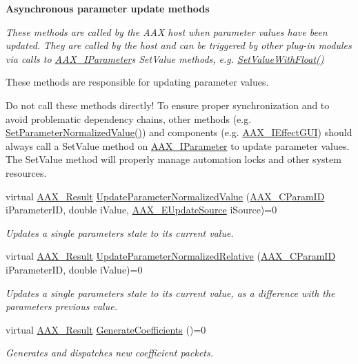 \begin{Indent}{\bf Asynchronous parameter update methods}\par
{\em These methods are called by the A\+A\+X host when parameter values have been updated. They are called by the host and can be triggered by other plug-\/in modules via calls to \hyperlink{a00108}{A\+A\+X\+\_\+\+I\+Parameter}\textquotesingle{}s {\ttfamily Set\+Value} methods, e.\+g. \hyperlink{a00108_a1d37b80bc3a9c4e53fc2c1684f47dfb7}{Set\+Value\+With\+Float()}

These methods are responsible for updating parameter values.

Do not call these methods directly! To ensure proper synchronization and to avoid problematic dependency chains, other methods (e.\+g. \hyperlink{a00061_a368b0f5a761d1eda4c41b420f153a077}{Set\+Parameter\+Normalized\+Value()}) and components (e.\+g. \hyperlink{a00098}{A\+A\+X\+\_\+\+I\+Effect\+G\+U\+I}) should always call a {\ttfamily Set\+Value} method on \hyperlink{a00108}{A\+A\+X\+\_\+\+I\+Parameter} to update parameter values. The {\ttfamily Set\+Value} method will properly manage automation locks and other system resources. }\begin{DoxyCompactItemize}
\item 
virtual \hyperlink{a00149_a4d8f69a697df7f70c3a8e9b8ee130d2f}{A\+A\+X\+\_\+\+Result} \hyperlink{a00061_a685858711efb8634ce66c327f2865c71}{Update\+Parameter\+Normalized\+Value} (\hyperlink{a00149_a1440c756fe5cb158b78193b2fc1780d1}{A\+A\+X\+\_\+\+C\+Param\+I\+D} i\+Parameter\+I\+D, double i\+Value, \hyperlink{a00206_a30be0398faf20c6b121239eb9399f3f7}{A\+A\+X\+\_\+\+E\+Update\+Source} i\+Source)=0
\begin{DoxyCompactList}\small\item\em Updates a single parameter\textquotesingle{}s state to its current value. \end{DoxyCompactList}\item 
virtual \hyperlink{a00149_a4d8f69a697df7f70c3a8e9b8ee130d2f}{A\+A\+X\+\_\+\+Result} \hyperlink{a00061_a54403bec090fcc999a93f54c01bca0c9}{Update\+Parameter\+Normalized\+Relative} (\hyperlink{a00149_a1440c756fe5cb158b78193b2fc1780d1}{A\+A\+X\+\_\+\+C\+Param\+I\+D} i\+Parameter\+I\+D, double i\+Value)=0
\begin{DoxyCompactList}\small\item\em Updates a single parameter\textquotesingle{}s state to its current value, as a difference with the parameter\textquotesingle{}s previous value. \end{DoxyCompactList}\item 
virtual \hyperlink{a00149_a4d8f69a697df7f70c3a8e9b8ee130d2f}{A\+A\+X\+\_\+\+Result} \hyperlink{a00061_a083265b008921b6114ede387711694b7}{Generate\+Coefficients} ()=0
\begin{DoxyCompactList}\small\item\em Generates and dispatches new coefficient packets. \end{DoxyCompactList}\end{DoxyCompactItemize}
\end{Indent}
